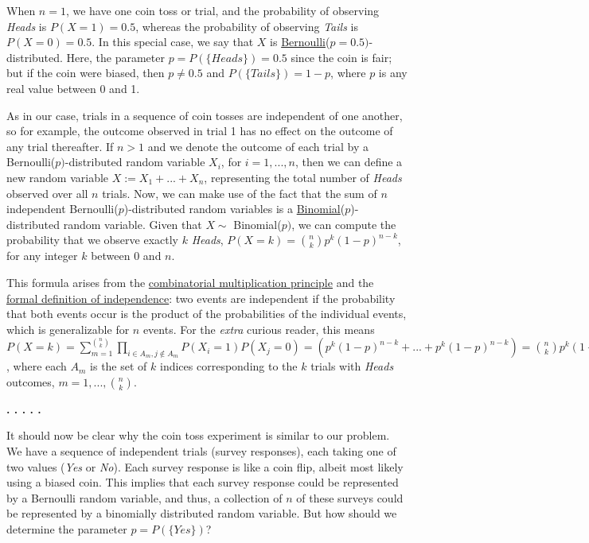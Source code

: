 When $n = 1$, we have one coin toss or trial, and the probability of observing \textit{Heads} is $P(X = 1) = 0.5$, whereas the probability of observing \textit{Tails} is $P(X = 0) = 0.5$. In this special case, we say that $X$ is \href{https://en.wikipedia.org/wiki/Bernoulli_distribution}{Bernoulli}($p = 0.5)$-distributed. Here, the parameter $p = P(\{\textit{Heads}\}) = 0.5$ since the coin is fair; but if the coin were biased, then $p \not= 0.5$ and $P(\{\textit{Tails}\}) = 1 - p$, where $p$ is any real value between 0 and 1.

As in our case, trials in a sequence of coin tosses are independent of one another, so for example, the outcome observed in trial 1 has no effect on the outcome of any trial thereafter. If $n > 1$ and we denote the outcome of each trial by a Bernoulli($p)$-distributed random variable $X_i$, for $i = 1,...,n$, then we can define a new random variable $X := X_1 + ... + X_n$, representing the total number of \textit{Heads} observed over all $n$ trials. Now, we can make use of the fact that the sum of $n$ independent Bernoulli($p$)-distributed random variables is a \href{https://en.wikipedia.org/wiki/Binomial_distribution}{Binomial}($p$)-distributed random variable. Given that $X \sim$ Binomial($p)$, we can compute the probability that we observe exactly $k$ \textit{Heads}, $P(X = k) = \binom{n}{k} p^k(1-p)^{n-k}$, for any integer $k$ between 0 and $n$.

This formula arises from the  \href{https://en.wikipedia.org/wiki/Rule_of_product}{combinatorial multiplication principle} and the \href{https://en.wikipedia.org/wiki/Independence_(probability_theory)#Definition}{formal definition of independence}: two events are independent if the probability that both events occur is the product of the probabilities of the individual events, which is generalizable for $n$ events. For the \textit{extra} curious reader, this means $P(X = k) = \sum_{m = 1}^{\binom{n}{k}}\prod_{i \in A_m, j \not\in A_m}P(X_i = 1)P(X_j = 0) = (p^k(1-p)^{n-k} + ... + p^k(1-p)^{n-k}) = \binom{n}{k} p^k(1-p)^{n-k}$, where each $A_m$ is the set of $k$ indices corresponding to the $k$ trials with \textit{Heads} outcomes, $m = 1,..., \binom{n}{k}$.

\textbf{. . . . .}

It should now be clear why the coin toss experiment is similar to our problem. We have a sequence of independent trials (survey responses), each taking one of two values (\textit{Yes} or \textit{No}). Each survey response is like a coin flip, albeit most likely using a biased coin. This implies that each survey response could be represented by a Bernoulli random variable, and thus, a collection of $n$ of these surveys could be represented by a binomially distributed random variable. But how should we determine the parameter $p = P(\{\textit{Yes}\})$?

